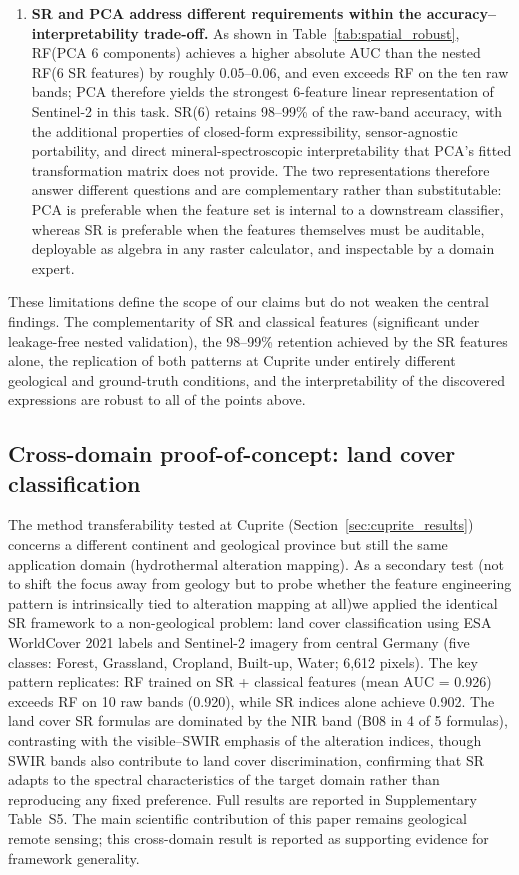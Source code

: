 \documentclass[preprint,authoryear,number]{elsarticle}
\begin{document}
\begin{enumerate}
  \item \textbf{SR and PCA address different requirements within the accuracy--interpretability trade-off.} As shown in Table~\ref{tab:spatial_robust}, RF(PCA 6 components) achieves a higher absolute AUC than the nested RF(6 SR features) by roughly $0.05$--$0.06$, and even exceeds RF on the ten raw bands; PCA therefore yields the strongest 6-feature linear representation of Sentinel-2 in this task. SR(6) retains 98--99\% of the raw-band accuracy, with the additional properties of closed-form expressibility, sensor-agnostic portability, and direct mineral-spectroscopic interpretability that PCA's fitted transformation matrix does not provide. The two representations therefore answer different questions and are complementary rather than substitutable: PCA is preferable when the feature set is internal to a downstream classifier, whereas SR is preferable when the features themselves must be auditable, deployable as algebra in any raster calculator, and inspectable by a domain expert.
\end{enumerate}

These limitations define the scope of our claims but do not weaken the central findings. The complementarity of SR and classical features (significant under leakage-free nested validation), the 98--99\% retention achieved by the SR features alone, the replication of both patterns at Cuprite under entirely different geological and ground-truth conditions, and the interpretability of the discovered expressions are robust to all of the points above.

\subsection{Cross-domain proof-of-concept: land cover classification}
\label{sec:crossdomain}

The method transferability tested at Cuprite (Section~\ref{sec:cuprite_results}) concerns a different continent and geological province but still the same application domain (hydrothermal alteration mapping). As a secondary test (not to shift the focus away from geology but to probe whether the feature engineering pattern is intrinsically tied to alteration mapping at all)we applied the identical SR framework to a non-geological problem: land cover classification using ESA WorldCover 2021 labels and Sentinel-2 imagery from central Germany (five classes: Forest, Grassland, Cropland, Built-up, Water; 6{,}612 pixels). The key pattern replicates: RF trained on SR + classical features (mean AUC = 0.926) exceeds RF on 10 raw bands (0.920), while SR indices alone achieve 0.902. The land cover SR formulas are dominated by the NIR band (B08 in 4 of 5 formulas), contrasting with the visible--SWIR emphasis of the alteration indices, though SWIR bands also contribute to land cover discrimination, confirming that SR adapts to the spectral characteristics of the target domain rather than reproducing any fixed preference. Full results are reported in Supplementary Table~S5. The main scientific contribution of this paper remains geological remote sensing; this cross-domain result is reported as supporting evidence for framework generality.
\end{document}
